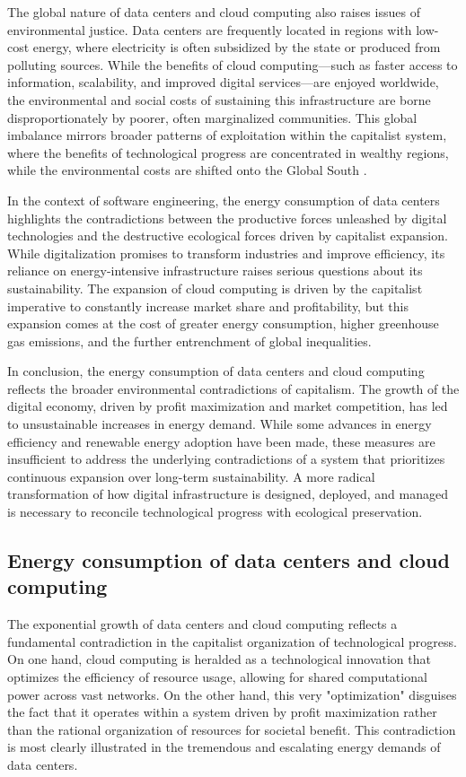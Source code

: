 The global nature of data centers and cloud computing also raises issues of environmental justice. Data centers are frequently located in regions with low-cost energy, where electricity is often subsidized by the state or produced from polluting sources. While the benefits of cloud computing—such as faster access to information, scalability, and improved digital services—are enjoyed worldwide, the environmental and social costs of sustaining this infrastructure are borne disproportionately by poorer, often marginalized communities. This global imbalance mirrors broader patterns of exploitation within the capitalist system, where the benefits of technological progress are concentrated in wealthy regions, while the environmental costs are shifted onto the Global South \cite[pp.~102-104]{fuchs2020}. 

In the context of software engineering, the energy consumption of data centers highlights the contradictions between the productive forces unleashed by digital technologies and the destructive ecological forces driven by capitalist expansion. While digitalization promises to transform industries and improve efficiency, its reliance on energy-intensive infrastructure raises serious questions about its sustainability. The expansion of cloud computing is driven by the capitalist imperative to constantly increase market share and profitability, but this expansion comes at the cost of greater energy consumption, higher greenhouse gas emissions, and the further entrenchment of global inequalities.

In conclusion, the energy consumption of data centers and cloud computing reflects the broader environmental contradictions of capitalism. The growth of the digital economy, driven by profit maximization and market competition, has led to unsustainable increases in energy demand. While some advances in energy efficiency and renewable energy adoption have been made, these measures are insufficient to address the underlying contradictions of a system that prioritizes continuous expansion over long-term sustainability. A more radical transformation of how digital infrastructure is designed, deployed, and managed is necessary to reconcile technological progress with ecological preservation.

\subsection{Energy consumption of data centers and cloud computing}

The exponential growth of data centers and cloud computing reflects a fundamental contradiction in the capitalist organization of technological progress. On one hand, cloud computing is heralded as a technological innovation that optimizes the efficiency of resource usage, allowing for shared computational power across vast networks. On the other hand, this very "optimization" disguises the fact that it operates within a system driven by profit maximization rather than the rational organization of resources for societal benefit. This contradiction is most clearly illustrated in the tremendous and escalating energy demands of data centers.

